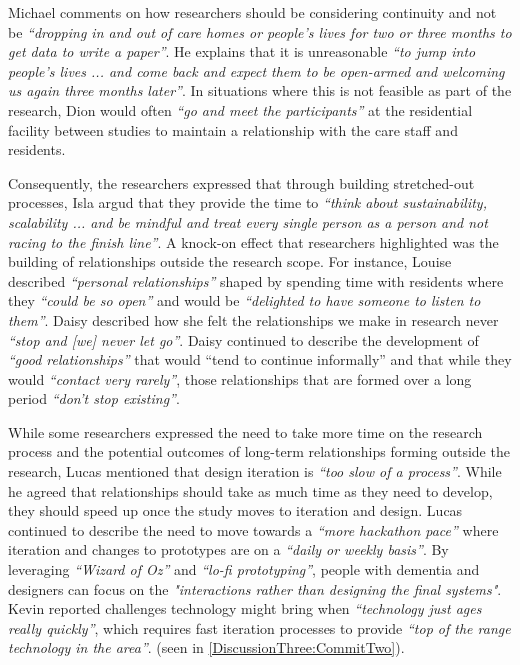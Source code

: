 Michael comments on how researchers should be considering continuity and not be \textit{``dropping in and out of care homes or people's lives for two or three months to get data to write a paper''}. He explains that it is unreasonable \textit{``to jump into people's lives ... and come back and expect them to be open-armed and welcoming us again three months later''}. In situations where this is not feasible as part of the research, Dion would often \textit{``go and meet the participants''} at the residential facility between studies to maintain a relationship with the care staff and residents. 

Consequently, the researchers expressed that through building stretched-out processes, Isla argud that they provide the time to \textit{``think about sustainability, scalability ... and be mindful and treat every single person as a person and not racing to the finish line''}. A knock-on effect that researchers highlighted was the building of relationships outside the research scope. For instance, Louise described \textit{``personal relationships''} shaped by spending time with residents where they \textit{``could be so open''} and would be \textit{``delighted to have someone to listen to them''}. Daisy described how she felt the relationships we make in research never \textit{``stop and [we] never let go''}. Daisy continued to describe the development of \textit{``good relationships''} that would ``tend to continue informally'' and that while they would \textit{``contact very rarely''}, those relationships that are formed over a long period \textit{``don't stop existing''}. 

While some researchers expressed the need to take more time on the research process and the potential outcomes of long-term relationships forming outside the research, Lucas mentioned that design iteration is \textit{``too slow of a process''}. While he agreed that relationships should take as much time as they need to develop, they should speed up once the study moves to iteration and design. Lucas continued to describe the need to move towards a \textit{``more hackathon pace''} where iteration and changes to prototypes are on a \textit{``daily or weekly basis''}. By leveraging \textit{``Wizard of Oz''} and \textit{``lo-fi prototyping''}, people with dementia and designers can focus on the \textit{"interactions rather than designing the final systems"}. Kevin reported challenges technology might bring when \textit{``technology just ages really quickly''}, which requires fast iteration processes to provide \textit{``top of the range technology in the area''}.  (seen in \ref{DiscussionThree:CommitTwo}). 

